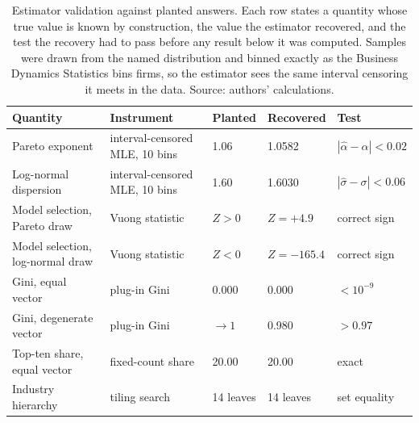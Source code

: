 \begin{table}[H]
\caption{Estimator validation against planted answers. Each row states a quantity whose
true value is known by construction, the value the estimator recovered, and the test the
recovery had to pass before any result below it was computed. Samples were drawn from the
named distribution and binned exactly as the Business Dynamics Statistics bins firms, so
the estimator sees the same interval censoring it meets in the data. Source: authors'
calculations.}
\label{tab:validation}
\begin{tabular}{lllll}
\toprule
Quantity & Instrument & Planted & Recovered & Test \\
\midrule
Pareto exponent & interval-censored MLE, 10 bins & 1.06 & 1.0582 & $|\hat\alpha-\alpha|<0.02$ \\
Log-normal dispersion & interval-censored MLE, 10 bins & 1.60 & 1.6030 & $|\hat\sigma-\sigma|<0.06$ \\
Model selection, Pareto draw & Vuong statistic & $Z>0$ & $Z=+4.9$ & correct sign \\
Model selection, log-normal draw & Vuong statistic & $Z<0$ & $Z=-165.4$ & correct sign \\
Gini, equal vector & plug-in Gini & 0.000 & 0.000 & $<10^{-9}$ \\
Gini, degenerate vector & plug-in Gini & $\to 1$ & 0.980 & $>0.97$ \\
Top-ten share, equal vector & fixed-count share & 20.00 & 20.00 & exact \\
Industry hierarchy & tiling search & 14 leaves & 14 leaves & set equality \\
\bottomrule
\end{tabular}
\end{table}
